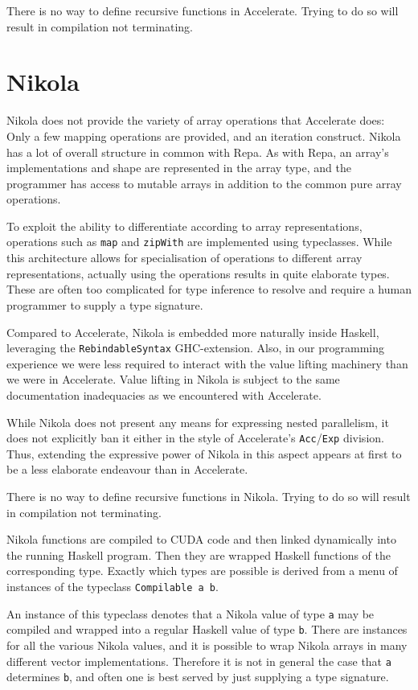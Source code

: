 There is no way to define recursive functions in Accelerate. Trying to do so
will result in compilation not terminating.

\section{Nikola}
\label{sec:language-discussion-nikola}

Nikola does not provide the variety of array operations that Accelerate does: Only
a few mapping operations are provided, and an iteration construct.  Nikola has
a lot of overall structure in common with Repa. As with Repa, an array's
implementations and shape are represented in the array type, and the programmer
has access to mutable arrays in addition to the common pure array operations.

To exploit the ability to differentiate according to array representations,
operations such as \texttt{map} and \texttt{zipWith} are implemented using
typeclasses.  While this architecture allows for specialisation of operations
to different array representations, actually using the operations results in quite
elaborate types. These are often too complicated for type inference to resolve
and require a human programmer to supply a type signature.

Compared to Accelerate, Nikola is embedded more naturally inside Haskell,
leveraging the \texttt{RebindableSyntax} GHC-extension. Also, in our programming
experience we were less required to interact with the value lifting machinery
than we were in Accelerate. Value lifting in Nikola is subject to the same
documentation inadequacies as we encountered with Accelerate.

While Nikola does not present any means for expressing nested parallelism, it
does not explicitly ban it either in the style of Accelerate's
\texttt{Acc}/\texttt{Exp} division. Thus, extending the expressive power of
Nikola in this aspect appears at first to be a less elaborate endeavour than in
Accelerate.

There is no way to define recursive functions in Nikola. Trying to do so
will result in compilation not terminating.

Nikola functions are compiled to CUDA code and then linked dynamically into
the running Haskell program. Then they are wrapped Haskell functions of
the corresponding type.  Exactly which types are possible is derived
from a menu of instances of the typeclass \texttt{Compilable a b}.

An instance of this typeclass denotes that a Nikola value of type \texttt{a}
may be compiled and wrapped into a regular Haskell value of type \texttt{b}.
There are instances for all the various Nikola values, and it is possible to
wrap Nikola arrays in many different vector implementations. Therefore it is
not in general the case that \texttt{a} determines \texttt{b}, and often one is
best served by just supplying a type signature.

